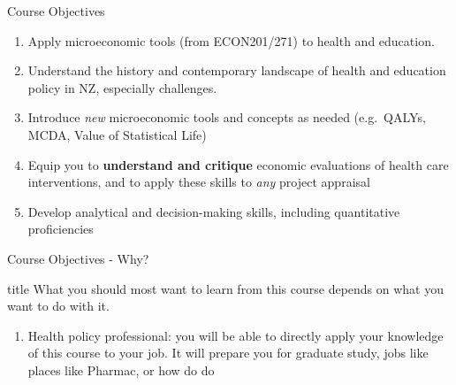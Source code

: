 \documentclass[aspectratio=169, 12pt]{beamer}
\begin{document}
\begin{frame}{Course Objectives}
  \begin{enumerate}
    \item Apply microeconomic tools (from ECON201/271) to health and education.
    \item Understand the history and contemporary landscape of health and education policy in NZ, especially challenges.
    \item Introduce \emph{new} microeconomic tools and concepts as needed (e.g.\ QALYs, MCDA,
          Value of Statistical Life)
    \item Equip you to \textbf{understand and critique} economic evaluations of health care
          interventions, and to apply these skills to \emph{any} project appraisal
    \item Develop analytical and decision-making skills, including quantitative proficiencies
  \end{enumerate}
\end{frame}

\begin{frame}{Course Objectives - Why?}
	\begin{alertblock}{title}
		What you should most want to learn from this course depends on what you want to do with it.
	\end{alertblock}
	\begin{enumerate}
		\item Health policy professional: you will be able to directly apply your knowledge of this course to your job. It will prepare you for graduate study, jobs like places like Pharmac, or how do do 
	\end{enumerate}
\end{frame}
\end{document}
